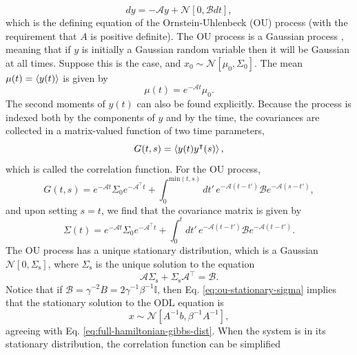 \documentclass[prx,onecolumn,floatfix,longbibliography,notitlepage, nofootinbib]{revtex4-1}
\begin{document}
\begin{appendix}
\begin{equation}
\label{eq:odl-ou-process}
    dy = - \mathcal{A}y + \mathcal{N}[0, \mathcal{B} dt],
\end{equation}
which is the defining equation of the Ornstein-Uhlenbeck (OU) process (with the requirement that $A$ is positive definite). The OU process is a Gaussian process \cite{mackay1998introduction}, meaning that if $y$ is initially a Gaussian random variable then it will be Gaussian at all times. Suppose this is the case, and $x_0 \sim \mathcal{N}[\mu_0,\Sigma_0]$. The mean $\mu(t) = \braket{y(t)}$ is given by
\begin{equation}
\label{eq:ou-solution-mu}
    \mu(t) = e^{-\mathcal{A} t}\mu_0.
\end{equation}
The second moments of $y(t)$ can also be found explicitly. Because the process is indexed both by the components of $y$ and by the time, the covariances are collected in a matrix-valued function of two time parameters,
\begin{equation}
    G(t,s) = \braket{y(t)y^\intercal(s)},
\end{equation}
which is called the correlation function. For the OU process,
\begin{equation}
\label{eq:ou-solution-G}
    G(t,s) = e^{-\mathcal{A}t}\Sigma_0 e^{-\mathcal{A}^\intercal t} + \int_{0}^{\text{min}(t,s)} dt' \, e^{-\mathcal{A} (t-t')} \mathcal{B} e^{- \mathcal{A} (s - t')},
\end{equation}
and upon setting $s=t$, we find that the covariance matrix is given by
\begin{equation}
    \Sigma(t) = e^{-\mathcal{A} t}\Sigma_0 e^{-\mathcal{A}^\intercal t} + \int_{0}^{t} dt' \, e^{-\mathcal{A} (t-t')} \mathcal{B} e^{- \mathcal{A} (t - t')}.
\end{equation}
The OU process has a unique stationary distribution, which is a Gaussian $\mathcal{N}[0,\Sigma_\text{s}]$, where $\Sigma_\text{s}$ is the unique solution to the equation
\begin{equation}
\label{eq:ou-stationary-sigma}
 \mathcal{A} \Sigma_\text{s} + \Sigma_\text{s} \mathcal{A}^\intercal= \mathcal{B}.
\end{equation}
Notice that if $\mathcal{B} = \gamma^{-2}B = 2\gamma^{-1}\beta^{-1}\mathbb{I}$, then Eq. \eqref{eq:ou-stationary-sigma} implies that the stationary solution to the ODL equation is
\begin{equation}
   x \sim \mathcal{N}[A^{-1} b, \beta^{-1}A^{-1}],
\end{equation}
agreeing with Eq. \eqref{eq:full-hamiltonian-gibbs-dist}. When the system is in its stationary distribution, the correlation function can be simplified

\end{appendix}
\end{document}

